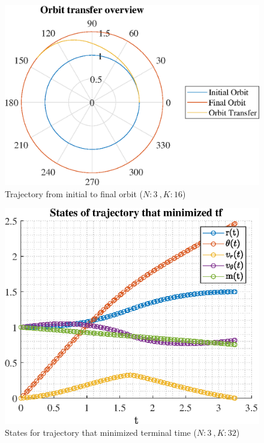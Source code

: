 \documentclass[]{article}
\begin{document}
	\begin{figure}
		\centering
		\includegraphics[scale=0.75]{orbit_N3_K16_C3_tf.eps}
		\caption{Trajectory from initial to final orbit (\(N:3\ , K:16\))}
		\label{fig:orbit_N3_K16_C3_tf}
	\end{figure}
	\begin{figure}
		\centering
		\includegraphics[scale=0.75]{states_N3_K32_C3_tf.eps}
		\caption{States for trajectory that minimized terminal time (\(N:3\ , K:32\))}
		\label{fig:states_N3_K32_C3_tf}
	\end{figure}
\end{document}
